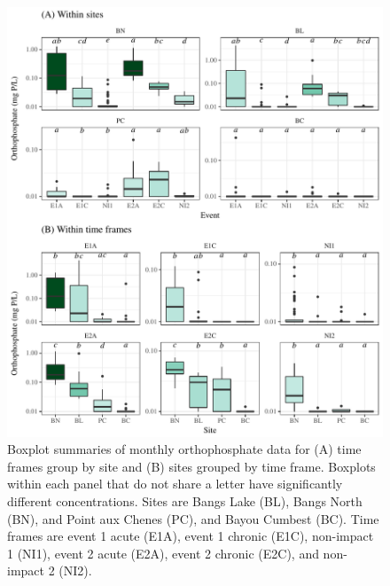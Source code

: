 \documentclass[letterpaper,12pt]{article}\usepackage[]{graphicx}\usepackage[]{color}
\makeatletter
\def\maxwidth{ %
  \ifdim\Gin@nat@width>\linewidth
    \linewidth
  \else
    \Gin@nat@width
  \fi
}
\makeatother
\begin{document}
\begin{figure}[!ht]

{\centering \includegraphics[width=\maxwidth]{figs/Fig6} 

}

\caption[Boxplot summaries of monthly orthophosphate data for (A) time frames group by site and (B) sites grouped by time frame]{Boxplot summaries of monthly orthophosphate data for (A) time frames group by site and (B) sites grouped by time frame. Boxplots within each panel that do not share a letter have significantly different concentrations. Sites are Bangs Lake (BL), Bangs North (BN), and Point aux Chenes (PC), and Bayou Cumbest (BC).  Time frames are event 1 acute (E1A), event 1 chronic (E1C), non-impact 1 (NI1), event 2 acute (E2A), event 2 chronic (E2C), and non-impact 2 (NI2).}\label{fig:Fig6}
\end{figure}
\end{document}
